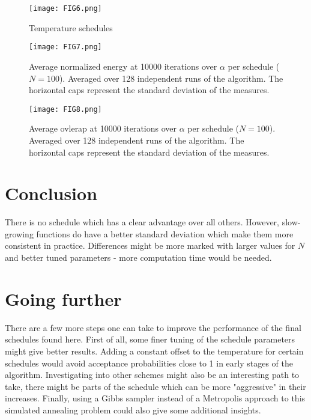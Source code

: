 \documentclass[a4paper]{article}
\begin{document}
\begin{figure}
\centering
\texttt{[image: FIG6.png]}
\caption{\label{fig:FIG6}Temperature schedules}
\end{figure}

\begin{figure}
\centering
\texttt{[image: FIG7.png]}
\caption{\label{fig:FIG7}Average normalized energy at 10000 iterations over $\alpha$ per schedule ($N = 100$). Averaged over 128 independent runs of the algorithm. The horizontal caps represent the standard deviation of the measures.}
\end{figure}

\begin{figure}
\centering
\texttt{[image: FIG8.png]}
\caption{\label{fig:FIG8}Average ovlerap at 10000 iterations over $\alpha$ per schedule ($N = 100$). Averaged over 128 independent runs of the algorithm. The horizontal caps represent the standard deviation of the measures.}
\end{figure}

\section{Conclusion}
There is no schedule which has a clear advantage over all others. However, slow-growing functions do have a better standard deviation which make them more consistent in practice. Differences might be more marked with larger values for $N$ and better tuned parameters - more computation time would be needed.

\section{Going further}
There are a few more steps one can take to improve the performance of the final schedules found here. First of all, some finer tuning of the schedule parameters might give better results. Adding a constant offset to the temperature for certain schedules would avoid acceptance probabilities close to 1 in early stages of the algorithm. Investigating into other schemes might also be an interesting path to take, there might be parts of the schedule which can be more "aggressive" in their increases. Finally, using a Gibbs sampler instead of a Metropolis approach to this simulated annealing problem could also give some additional insights.
\end{document}
